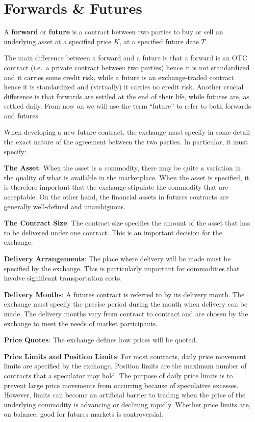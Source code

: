 \section{Forwards \& Futures}

A \textbf{forward} or \textbf{future} is a contract between two parties to buy or sell an underlying asset at a
specified price $K$, at a specified future date $T$.
\ed

The main difference between a forward and a future is that a forward is an OTC contract (i.e.\ a private contract
between two parties) hence it is not standardized and it carries some credit risk, while a future is an
exchange-traded contract hence it is standardized and (virtually) it carries no credit risk. Another crucial
difference is that forwards are settled at the end of their life, while futures are, as settled daily. From now on
we will use the term ``future'' to refer to both forwards and futures.

When developing a new future contract, the exchange must specify in some detail the exact nature of the agreement
between the two parties. In particular, it must specify:
\bit
\item \textbf{The Asset}: When the asset is a commodity, there may be quite a variation in the quality of what is
available in the marketplace. When the asset is specified, it is therefore important that the exchange stipulate the
commodity that are acceptable. On the other hand, the financial assets in futures contracts are generally well-defined
and unambiguous.
\item \textbf{The Contract Size}: The contract size specifies the amount of the asset that has to be delivered under
one contract. This is an important decision for the exchange.
\item \textbf{Delivery Arrangements}: The place where delivery will be made must be specified by the exchange. This is
particularly important for commodities that involve significant transportation costs.
\item \textbf{Delivery Months}: A futures contract is referred to by its delivery month. The exchange must specify the
precise period during the month when delivery can be made. The delivery months vary from contract to contract and are
chosen by the exchange to meet the needs of market participants.
\item \textbf{Price Quotes}: The exchange defines how prices will be quoted.
\item \textbf{Price Limits and Position Limits}: For most contracts, daily price movement limits are specified by
the exchange. Position limits are the maximum number of contracts that a speculator may hold. The purpose of daily
price limits is to prevent large price movements from occurring because of speculative excesses. However, limits can
become an artificial barrier to trading when the price of the underlying commodity is advancing or declining
rapidly. Whether price limits are, on balance, good for futures markets is controversial.
\eit

